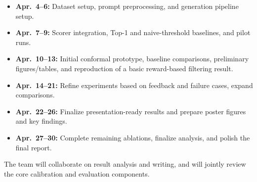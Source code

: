 \documentclass[twocolumn,11pt]{article}
\theoremstyle{plain}
\theoremstyle{definition}
\theoremstyle{remark}
\begin{document}
\begin{itemize}[leftmargin=1.2em]
    \item \textbf{Apr.~4--6:} Dataset setup, prompt preprocessing, and generation pipeline setup.
    \item \textbf{Apr.~7--9:} Scorer integration, Top-1 and naive-threshold baselines, and pilot runs.
    \item \textbf{Apr.~10--13:} Initial conformal prototype, baseline comparisons, preliminary figures/tables, and reproduction of a basic reward-based filtering result.
    \item \textbf{Apr.~14--21:} Refine experiments based on feedback and failure cases, expand comparisons.
    \item \textbf{Apr.~22--26:} Finalize presentation-ready results and prepare poster figures and key findings.
    \item \textbf{Apr.~27--30:} Complete remaining ablations, finalize analysis, and polish the final report.
\end{itemize}

The team will collaborate on result analysis and writing, and will jointly review the core calibration and evaluation components.


\newpage



\end{document}
